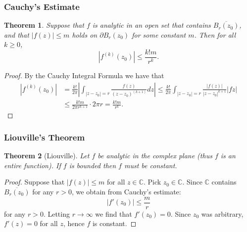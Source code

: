 \documentclass{article}
\newtheorem{theorem}{Theorem}[section]
\begin{document}
\subsubsection{Cauchy's Estimate}
\begin{theorem}
Suppose that $f$ is analytic in an open set that contains $\overline{B_r(z_0)}$, and that $\left|f(z)\right| \leq m$ holds on $\partial B_r(z_0)$ for some constant $m$. Then for all $k \geq 0$,
\begin{equation*}
\left|f^{(k)}(z_0)\right| \leq \frac{k!m}{r^k}.
\end{equation*}
\end{theorem}
\begin{proof}
By the Cauchy Integral Formula we have that
\begin{align*}
\left|f^{(k)}(z_0) \right| &= \frac{k!}{2\pi} \left| \int_{\left|z - z_0\right| = r} \frac{f(z)}{(z - z_0)^{(k+1)}}dz\right| \leq \frac{k!}{2\pi} \int_{\left|z - z_0\right|=r} \frac{\left|f(z)\right|}{\left|z - z_0\right|^{k+1}} \left|fz\right| \\
&\leq \frac{k!m}{2\pi r^{k+1}} \cdot 2\pi r = \frac{k!m}{r^k}.
\end{align*}
\end{proof}

\subsubsection{Liouville's Theorem}
\begin{theorem}[Liouville]
Let $f$ be analytic in the complex plane (thus $f$ is an entire function). If $f$ is bounded then $f$ must be constant.
\end{theorem}
\begin{proof}
Suppose that $\left|f(z)\right| \leq m$ for all $z \in \mathbb{C}$. Pick $z_0 \in \mathbb{C}$. Since $\mathbb{C}$ contains $\overline{B_r(z_0)}$ for any $r > 0$, we obtain from Cauchy's estimate:
\begin{equation*}
\left|f'(z_0)\right| \leq \frac{m}{r}
\end{equation*}
for any $r > 0$. Letting $r \to \infty$ we find that $f'(z_0) = 0$. Since $z_0$ was arbitrary, $f'(z) = 0$ for all $z$, hence $f$ is constant.
\end{proof}
\end{document}

